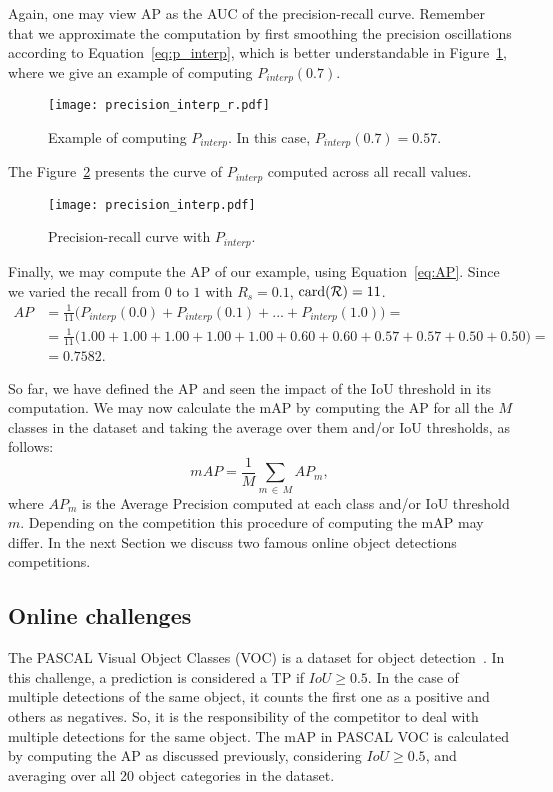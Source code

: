 Again, one may view AP as the AUC of the precision-recall curve.
Remember that we approximate the computation by first smoothing the precision oscillations according to Equation~\eqref{eq:p_interp}, which is better understandable in Figure~\ref{fig:prec-rec_curve_interp_ex},
where we give an example of computing $P_{interp}(0.7)$.
%
%
\begin{figure}[th!]
	\centering
	\texttt{[image: precision\_interp\_r.pdf]}
	\caption[Example of computing $P_{interp}$]{Example of computing $P_{interp}$. In this case, $P_{interp}(0.7) = 0.57$.}
	\label{fig:prec-rec_curve_interp_ex}
\end{figure}
%
The Figure~\ref{fig:prec-rec_curve_interp} presents the curve of $P_{interp}$ computed across all recall values.
%
%
\begin{figure}[bh!]
	\centering
	\texttt{[image: precision\_interp.pdf]}
	\caption{Precision-recall curve with $P_{interp}$.}
	\label{fig:prec-rec_curve_interp}
\end{figure}
%
Finally, we may compute the AP of our example, using Equation~\eqref{eq:AP}. Since we varied the recall from $0$ to $1$ with $R_s=0.1$, $\operatorname*{\textrm{card}}(\mathcal{R})=11$.
\begin{equation*}
\begin{split}
AP &= \frac{1}{11}\bigg(P_{interp}(0.0)+P_{interp}(0.1)+...+P_{interp}(1.0)\bigg) =\\
   &= \frac{1}{11}\bigg(1.00 + 1.00 + 1.00 + 1.00 + 1.00 + 0.60 + 0.60 + 0.57 + 0.57 + 0.50 + 0.50 \bigg) =\\
   &= 0.7582.
\end{split}
\end{equation*}

So far, we have defined the AP and seen the impact of the IoU threshold in its computation.
We may now calculate the mAP by computing the AP for all the $M$ classes in the dataset and taking the average over them and/or IoU thresholds, as follows:
%
\begin{equation}
mAP = \frac{1}{M}\sum_{m\,\in\,M}AP_m,
\label{eq:mAP}
\end{equation}
%
where $AP_m$ is the Average Precision computed at each class and/or IoU threshold $m$.
%
Depending on the competition this procedure of computing the mAP may differ.
In the next Section we discuss two famous online object detections competitions.

\subsection{Online challenges}
%
The PASCAL Visual Object Classes (VOC) is a dataset for object detection~\cite{Everingham10}.
In this challenge, a prediction is considered a TP if $IoU \geq 0.5$.
In the case of multiple detections of the same object, it counts the first one as a positive and others as negatives.
So, it is the responsibility of the competitor to deal with multiple detections for the same object.
The mAP in PASCAL VOC is calculated by computing the AP as discussed previously, considering $IoU \geq0.5$, and averaging over all 20 object categories in the dataset.
%

